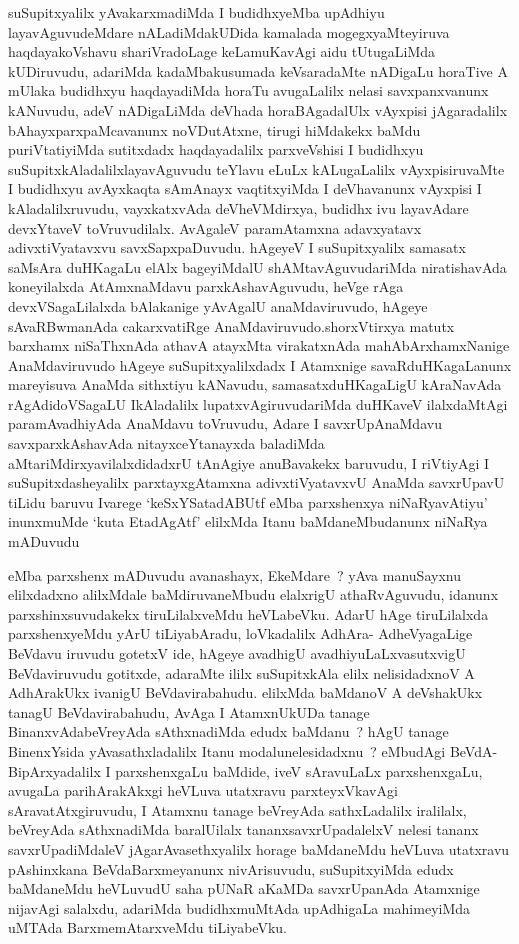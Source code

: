 \begin{artha}
suSupitxyalilx yAvakarxmadiMda I budidhxyeMba upAdhiyu
layavAguvudeMdare nALadiMdakUDida kamalada mogegxyaMteyiruva
haqdayakoVshavu shariVradoLage keLamuKavAgi aidu tUtugaLiMda
kUDiruvudu, adariMda kadaMbakusumada keVsaradaMte nADigaLu horaTive A
mUlaka budidhxyu haqdayadiMda horaTu avugaLalilx nelasi savxpanxvanunx
kANuvudu, adeV nADigaLiMda deVhada horaBAgadalUlx vAyxpisi
jAgaradalilx bAhayxparxpaMcavanunx noVDutAtxne, tirugi hiMdakekx baMdu
puriVtatiyiMda sutitxdadx haqdayadalilx parxveVshisi I budidhxyu
suSupitxkAladalilxlayavAguvudu teYlavu eLuLx kALugaLalilx
vAyxpisiruvaMte I budidhxyu avAyxkaqta sAmAnayx vaqtitxyiMda I
deVhavanunx vAyxpisi I kAladalilxruvudu, vayxkatxvAda deVheVMdirxya,
budidhx ivu layavAdare devxYtaveV toVruvudilalx. AvAgaleV paramAtamxna
adavxyatavx adivxtiVyatavxvu savxSapxpaDuvudu. hAgeyeV I suSupitxyalilx
samasatx saMsAra duHKagaLu elAlx bageyiMdalU shAMtavAguvudariMda
niratishavAda koneyilalxda AtAmxnaMdavu parxkAshavAguvudu, heVge rAga
devxVSagaLilalxda bAlakanige yAvAgalU  anaMdaviruvudo, hAgeye
sAvaRBwmanAda cakarxvatiRge AnaMdaviruvudo.shorxVtirxya  matutx
barxhamx niSaThxnAda athavA atayxMta virakatxnAda 
mahAbArxhamxNanige AnaMdaviruvudo hAgeye suSupitxyalilxdadx I
Atamxnige savaRduHKagaLanunx mareyisuva AnaMda sithxtiyu kANavudu,
samasatxduHKagaLigU kAraNavAda rAgAdidoVSagaLU IkAladalilx
lupatxvAgiruvudariMda duHKaveV ilalxdaMtAgi paramAvadhiyAda AnaMdavu
toVruvudu, Adare I savxrUpAnaMdavu savxparxkAshavAda nitayxceYtanayxda
baladiMda aMtariMdirxyavilalxdidadxrU tAnAgiye anuBavakekx baruvudu, I
riVtiyAgi I suSupitxdasheyalilx parxtayxgAtamxna adivxtiVyatavxvU AnaMda
savxrUpavU tiLidu baruvu Ivarege `keSxYSatadABUtf eMba parxshenxya
niNaRyavAtiyu' inunxmuMde `kuta EtadAgAtf' elilxMda Itanu
baMdaneMbudanunx niNaRya mADuvudu  \mdash 
\end{artha}


\begin{artha}
eMba parxshenx mADuvudu avanashayx, EkeMdare~? yAva manuSayxnu
elilxdadxno alilxMdale baMdiruvaneMbudu elalxrigU athaRvAguvudu,
idanunx parxshinxsuvudakekx tiruLilalxveMdu heVLabeVku. AdarU hAge
tiruLilalxda parxshenxyeMdu yArU tiLiyabAradu, loVkadalilx AdhAra-
AdheVyagaLige BeVdavu iruvudu gotetxV ide, hAgeye avadhigU
avadhiyuLaLxvasutxvigU BeVdaviruvudu gotitxde, adaraMte ililx suSupitxkAla
elilx nelisidadxnoV A AdhArakUkx ivanigU BeVdavirabahudu. elilxMda
baMdanoV A deVshakUkx tanagU BeVdavirabahudu, AvAga  I AtamxnUkUDa
tanage BinanxvAdabeVreyAda sAthxnadiMda edudx baMdanu~? hAgU tanage
BinenxYsida yAvasathxladalilx Itanu modalunelesidadxnu~? eMbudAgi BeVdA-BipArxyadalilx I parxshenxgaLu baMdide, iveV sAravuLaLx
parxshenxgaLu, avugaLa parihArakAkxgi heVLuva utatxravu
parxteyxVkavAgi sAravatAtxgiruvudu, I Atamxnu tanage beVreyAda
sathxLadalilx iralilalx, beVreyAda sAthxnadiMda baralUilalx
tananxsavxrUpadalelxV nelesi tananx savxrUpadiMdaleV
jAgarAvasethxyalilx horage baMdaneMdu heVLuva utatxravu pAshinxkana
BeVdaBarxmeyanunx nivArisuvudu, suSupitxyiMda edudx baMdaneMdu
heVLuvudU saha pUNaR aKaMDa savxrUpanAda Atamxnige nijavAgi salalxdu,
adariMda budidhxmuMtAda upAdhigaLa mahimeyiMda uMTAda
BarxmemAtarxveMdu tiLiyabeVku.
\end{artha}

